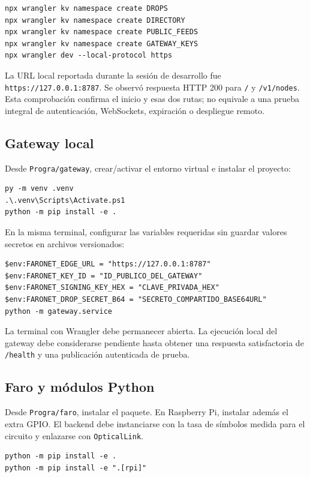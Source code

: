 \documentclass[12pt,a4paper]{article}
\begin{document}
\begin{lstlisting}[style=terminal]
npx wrangler kv namespace create DROPS
npx wrangler kv namespace create DIRECTORY
npx wrangler kv namespace create PUBLIC_FEEDS
npx wrangler kv namespace create GATEWAY_KEYS
npx wrangler dev --local-protocol https
\end{lstlisting}

La URL local reportada durante la sesión de desarrollo fue
\texttt{https://127.0.0.1:8787}. Se observó respuesta HTTP 200 para \texttt{/}
y \texttt{/v1/nodes}. Esta comprobación confirma el inicio y esas dos rutas;
no equivale a una prueba integral de autenticación, WebSockets, expiración o
despliegue remoto.

\subsection{Gateway local}
Desde \texttt{Progra/gateway}, crear/activar el entorno virtual e instalar el
proyecto:
\begin{lstlisting}[style=terminal]
py -m venv .venv
.\.venv\Scripts\Activate.ps1
python -m pip install -e .
\end{lstlisting}

En la misma terminal, configurar las variables requeridas sin guardar valores
secretos en archivos versionados:
\begin{lstlisting}[style=terminal]
$env:FARONET_EDGE_URL = "https://127.0.0.1:8787"
$env:FARONET_KEY_ID = "ID_PUBLICO_DEL_GATEWAY"
$env:FARONET_SIGNING_KEY_HEX = "CLAVE_PRIVADA_HEX"
$env:FARONET_DROP_SECRET_B64 = "SECRETO_COMPARTIDO_BASE64URL"
python -m gateway.service
\end{lstlisting}

La terminal con Wrangler debe permanecer abierta. La ejecución local del
gateway debe considerarse pendiente hasta obtener una respuesta satisfactoria
de \texttt{/health} y una publicación autenticada de prueba.

\subsection{Faro y módulos Python}
Desde \texttt{Progra/faro}, instalar el paquete. En Raspberry Pi, instalar
además el extra GPIO. El backend debe instanciarse con la tasa de símbolos
medida para el circuito y enlazarse con \texttt{OpticalLink}.
\begin{lstlisting}[style=terminal]
python -m pip install -e .
python -m pip install -e ".[rpi]"
\end{lstlisting}
\end{document}
